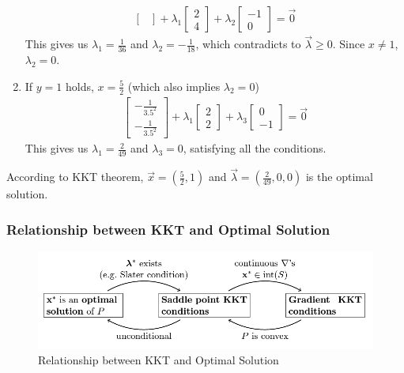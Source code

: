 \documentclass[11pt,a4paper]{article}
\begin{document}
\begin{enumerate}[$\bullet$]
\begin{equation}
\begin{aligned}
\begin{bmatrix}
            \end{bmatrix}+\lambda_1 \begin{bmatrix}
                2\\4
            \end{bmatrix}+ \lambda_2 \begin{bmatrix}
                -1\\0
            \end{bmatrix}=\vec{0}
        \end{aligned}
        \nonumber
    \end{equation}
    This gives us $\lambda_1=\frac{1}{36}$ and $\lambda_2=-\frac{1}{18}$, which contradicts to $\vec{\lambda}\geq 0$. Since $x\neq 1$, $\lambda_2=0$.
    \item If $y=1$ holds, $x=\frac{5}{2}$ (which also implies $\lambda_2=0$)
    \begin{equation}
        \begin{aligned}
            \begin{bmatrix}
                -\frac{1}{{3.5}^2}\\-\frac{1}{{3.5}^2}
            \end{bmatrix}+\lambda_1 \begin{bmatrix}
                2\\2
            \end{bmatrix}+ \lambda_3 \begin{bmatrix}
                0\\-1
            \end{bmatrix}=\vec{0}
        \end{aligned}
        \nonumber
    \end{equation}
    This gives us $\lambda_1=\frac{2}{49}$ and $\lambda_3=0$, satisfying all the conditions.
\end{enumerate}
According to KKT theorem, $\vec{x}=(\frac{5}{2},1)$ and $\vec{\lambda}=(\frac{2}{49},0,0)$ is the optimal solution.

\subsubsection{Relationship between KKT and Optimal Solution}
\begin{center}\begin{figure}[htbp]
    \centering
    \includegraphics[scale=0.4]{KKT_opt.png}
    \caption{Relationship between KKT and Optimal Solution}
    \label{}
\end{figure}\end{center}
\end{document}
